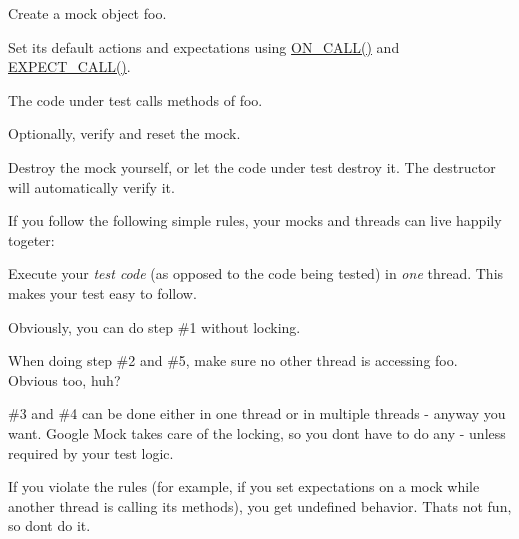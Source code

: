 \begin{DoxyEnumerate}
\item Create a mock object {\ttfamily foo}.
\end{DoxyEnumerate}
\begin{DoxyEnumerate}
\item Set its default actions and expectations using {\ttfamily \hyperlink{gmock-spec-builders_8h_a5b12ae6cf84f0a544ca811b380c37334}{O\+N\+\_\+\+C\+A\+L\+L()}} and {\ttfamily \hyperlink{gmock-spec-builders_8h_a535a6156de72c1a2e25a127e38ee5232}{E\+X\+P\+E\+C\+T\+\_\+\+C\+A\+L\+L()}}.
\end{DoxyEnumerate}
\begin{DoxyEnumerate}
\item The code under test calls methods of {\ttfamily foo}.
\end{DoxyEnumerate}
\begin{DoxyEnumerate}
\item Optionally, verify and reset the mock.
\end{DoxyEnumerate}
\begin{DoxyEnumerate}
\item Destroy the mock yourself, or let the code under test destroy it. The destructor will automatically verify it.
\end{DoxyEnumerate}

If you follow the following simple rules, your mocks and threads can live happily togeter\+:


\begin{DoxyItemize}
\item Execute your {\itshape test code} (as opposed to the code being tested) in {\itshape one} thread. This makes your test easy to follow.
\item Obviously, you can do step \#1 without locking.
\item When doing step \#2 and \#5, make sure no other thread is accessing {\ttfamily foo}. Obvious too, huh?
\item \#3 and \#4 can be done either in one thread or in multiple threads -\/ anyway you want. Google Mock takes care of the locking, so you don\textquotesingle{}t have to do any -\/ unless required by your test logic.
\end{DoxyItemize}

If you violate the rules (for example, if you set expectations on a mock while another thread is calling its methods), you get undefined behavior. That\textquotesingle{}s not fun, so don\textquotesingle{}t do it.

